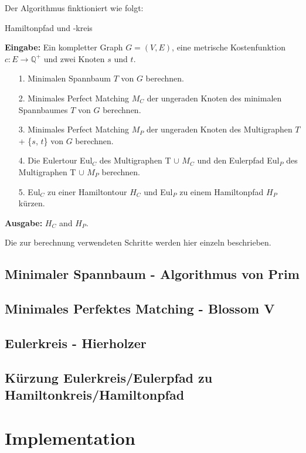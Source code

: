 \documentclass[a4paper]{article}
\begin{document}
Der Algorithmus finktioniert wie folgt:
\begin{algorithm}
    \caption{Hamiltonpfad und -kreis \cite{moemke11}}
\textbf{Eingabe:} Ein kompletter Graph $G = (V,E)$, eine metrische Kostenfunktion $c: E \rightarrow \mathbb{Q}^+$ und zwei Knoten $s$ und $t$.
    \begin{itemize}
        \item[1.] Minimalen Spannbaum $T$ von $G$ berechnen.
        \item[2.] Minimales Perfect Matching $M_C$ der ungeraden Knoten des minimalen Spannbaumes $T$ von $G$ berechnen.
        \item[3.] Minimales Perfect Matching $M_P$ der ungeraden Knoten des Multigraphen $T$ + \{$s$, $t$\} von $G$ berechnen.
        \item[4.] Die Eulertour Eul$_C$ des Multigraphen T $\cup$ $M_C$ und den Eulerpfad Eul$_P$ des Multigraphen T $\cup$ $M_P$ berechnen.
        \item[5.] Eul$_C$ zu einer Hamiltontour $H_C$ und Eul$_P$ zu einem Hamiltonpfad $H_P$ kürzen.
    \end{itemize}
\textbf{Ausgabe:} $H_C$ and $H_P$.

\end{algorithm}

Die zur berechnung verwendeten Schritte werden hier einzeln beschrieben.

\subsection{Minimaler Spannbaum - Algorithmus von Prim}


\subsection{Minimales Perfektes Matching - Blossom V}
\subsection{Eulerkreis - Hierholzer}
\subsection{Kürzung Eulerkreis/Eulerpfad zu Hamiltonkreis/Hamiltonpfad}
\newpage
\section{Implementation}
\end{document}
